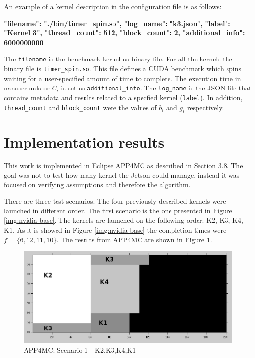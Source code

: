 \documentclass[
  12pt,
  a4paperpaper,
]{report}
\newenvironment{Shaded}{}{}
\newcommand{\ErrorTok}[1]{\textcolor[rgb]{1.00,0.00,0.00}{\textbf{#1}}}
\begin{document}
An example of a kernel description in the configuration file is as
follows:

\begin{Shaded}
\begin{Highlighting}[]
      \ErrorTok{"filename":} \ErrorTok{"./bin/timer\_spin.so",}
      \ErrorTok{"log\_name":} \ErrorTok{"k3.json",}
      \ErrorTok{"label":} \ErrorTok{"Kernel} \ErrorTok{3",}
      \ErrorTok{"thread\_count":} \ErrorTok{512,}
      \ErrorTok{"block\_count":} \ErrorTok{2,}
      \ErrorTok{"additional\_info":} \ErrorTok{6000000000}
\end{Highlighting}
\end{Shaded}

The \texttt{filename} is the benchmark kernel as binary file.
For all the kernels the binary file is \texttt{timer\_spin.so}. This file defines a
CUDA benchmark which spins waiting for a user-specified
amount of time to complete. The execution time in nanoseconds or \(C_i\)
is set as \texttt{additional\_info}. The \texttt{log\_name} is the
JSON file that contains metadata and results related to a specfied
kernel (\texttt{label}). In addition, \texttt{thread\_count} and
\texttt{block\_count} were the values of \(b_i\) and \(g_i\)
respectively.

\hypertarget{implementation-results}{%
\section{Implementation results}\label{implementation-results}}

This work is implemented in  Eclipse APP4MC as described in Section 3.8. The goal was not to test
how many kernel the Jetson could manage, instead it was focused on verifying
assumptions and therefore the algorithm.

There are  three test scenarios. The four previously described kernels
were launched in different order. The first scenario is the one
presented in Figure \ref{img:nvidia-base}. The kernels are launched on
the following order: K2, K3, K4, K1. As it is showed in Figure
\ref{img:nvidia-base} the completion times were \(f = \{6, 12,11,10\}\).
The results from APP4MC are shown in Figure \ref{img:octave-base}.

\begin{figure}
\centering
\includegraphics[width=1\textwidth,height=\textheight]{source/figures/octave/base.png}
\caption{APP4MC: Scenario 1 - K2,K3,K4,K1 \label{img:octave-base}}
\end{figure}
\end{document}
